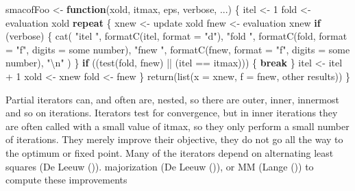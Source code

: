 \documentclass[
  12pt,
  letterpaper,
  DIV=11,
  numbers=noendperiod]{scrartcl}
\newenvironment{Shaded}{\begin{snugshade}}{\end{snugshade}}
\newcommand{\AttributeTok}[1]{\textcolor[rgb]{0.40,0.45,0.13}{#1}}
\newcommand{\ControlFlowTok}[1]{\textcolor[rgb]{0.00,0.23,0.31}{\textbf{#1}}}
\newcommand{\DecValTok}[1]{\textcolor[rgb]{0.68,0.00,0.00}{#1}}
\newcommand{\FunctionTok}[1]{\textcolor[rgb]{0.28,0.35,0.67}{#1}}
\newcommand{\NormalTok}[1]{\textcolor[rgb]{0.00,0.23,0.31}{#1}}
\newcommand{\OtherTok}[1]{\textcolor[rgb]{0.00,0.23,0.31}{#1}}
\newcommand{\SpecialCharTok}[1]{\textcolor[rgb]{0.37,0.37,0.37}{#1}}
\newcommand{\StringTok}[1]{\textcolor[rgb]{0.13,0.47,0.30}{#1}}
\theoremstyle{plain}
\theoremstyle{remark}
\begin{document}
\begin{Shaded}
\begin{Highlighting}[]
\NormalTok{smacofFoo }\OtherTok{\textless{}{-}} \ControlFlowTok{function}\NormalTok{(xold, itmax, eps, verbose, ...) \{}
\NormalTok{  itel }\OtherTok{\textless{}{-}} \DecValTok{1}
\NormalTok{  fold }\OtherTok{\textless{}{-}}\NormalTok{ evaluation xold}
  \ControlFlowTok{repeat}\NormalTok{ \{}
\NormalTok{    xnew }\OtherTok{\textless{}{-}}\NormalTok{ update xold}
\NormalTok{    fnew }\OtherTok{\textless{}{-}}\NormalTok{ evaluation xnew}
    \ControlFlowTok{if}\NormalTok{ (verbose) \{}
      \FunctionTok{cat}\NormalTok{(}
        \StringTok{"itel "}\NormalTok{,}
        \FunctionTok{formatC}\NormalTok{(itel, }\AttributeTok{format =} \StringTok{"d"}\NormalTok{),}
        \StringTok{"fold "}\NormalTok{,}
        \FunctionTok{formatC}\NormalTok{(fold, }\AttributeTok{format =} \StringTok{"f"}\NormalTok{, }\AttributeTok{digits =}\NormalTok{ some number),}
        \StringTok{"fnew "}\NormalTok{,}
        \FunctionTok{formatC}\NormalTok{(fnew, }\AttributeTok{format =} \StringTok{"f"}\NormalTok{, }\AttributeTok{digits =}\NormalTok{ some number),}
        \StringTok{"}\SpecialCharTok{\textbackslash{}n}\StringTok{"}
\NormalTok{      )}
\NormalTok{    \}}
    \ControlFlowTok{if}\NormalTok{ ((}\FunctionTok{test}\NormalTok{(fold, fnew) }\SpecialCharTok{||}\NormalTok{ (itel }\SpecialCharTok{==}\NormalTok{ itmax))) \{}
      \ControlFlowTok{break}
\NormalTok{    \}}
\NormalTok{    itel }\OtherTok{\textless{}{-}}\NormalTok{ itel }\SpecialCharTok{+} \DecValTok{1}
\NormalTok{    xold }\OtherTok{\textless{}{-}}\NormalTok{ xnew}
\NormalTok{    fold }\OtherTok{\textless{}{-}}\NormalTok{ fnew}
\NormalTok{  \}}
  \FunctionTok{return}\NormalTok{(}\FunctionTok{list}\NormalTok{(}\AttributeTok{x =}\NormalTok{ xnew, }\AttributeTok{f =}\NormalTok{ fnew, other results))}
\NormalTok{\}}
\end{Highlighting}
\end{Shaded}

Partial iterators can, and often are, nested, so there are outer, inner,
innermost and so on iterations. Iterators test for convergence, but in
inner iterations they are often called with a small value of itmax, so
they only perform a small number of iterations. They merely improve
their objective, they do not go all the way to the optimum or fixed
point. Many of the iterators depend on alternating least squares (De
Leeuw ()). majorization (De Leeuw
()), or MM (Lange
()) to compute these improvements
\end{document}
